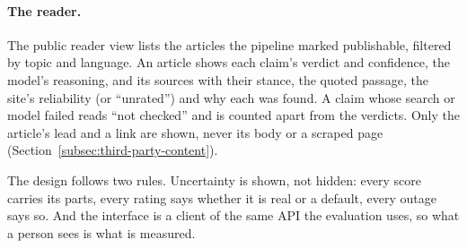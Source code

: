 \paragraph{The reader.} The public reader view lists the articles the
pipeline marked publishable, filtered by topic and language. An article
shows each claim's verdict and confidence, the model's reasoning, and
its sources with their stance, the quoted passage, the site's
reliability (or ``unrated'') and why each was found. A claim whose
search or model failed reads ``not checked'' and is counted apart from
the verdicts. Only the article's lead and a link are shown, never its
body or a scraped page (Section~\ref{subsec:third-party-content}).

The design follows two rules. Uncertainty is shown, not hidden: every
score carries its parts, every rating says whether it is real or a
default, every outage says so. And the interface is a client of the
same API the evaluation uses, so what a person sees is what is measured.
